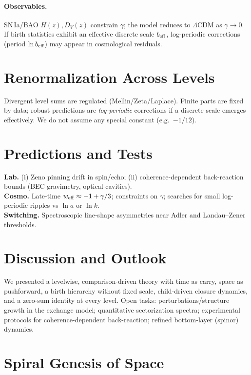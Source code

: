 \documentclass[11pt]{article}
\begin{document}
\paragraph{Observables.}
SN\,Ia/BAO $H(z),D_V(z)$ constrain $\gamma$; the model reduces to $\Lambda$CDM as $\gamma\to 0$.
If birth statistics exhibit an effective discrete scale $b_{\rm eff}$, log-periodic corrections (period $\ln b_{\rm eff}$) may appear in cosmological residuals.

\section{Renormalization Across Levels}
Divergent level sums are regulated (Mellin/Zeta/Laplace). Finite parts are fixed by data; robust predictions are \emph{log-periodic} corrections if a discrete scale emerges effectively. We do not assume any special constant (e.g.\ $-1/12$).

\section{Predictions and Tests}
\textbf{Lab.} (i) Zeno pinning drift in spin/echo; (ii) coherence-dependent back-reaction bounds (BEC gravimetry, optical cavities).\\
\textbf{Cosmo.} Late-time $w_{\rm eff}\approx -1+\gamma/3$; constraints on $\gamma$; searches for small log-periodic ripples vs $\ln a$ or $\ln k$.\\
\textbf{Switching.} Spectroscopic line-shape asymmetries near Adler and Landau--Zener thresholds.

\section{Discussion and Outlook}
We presented a levelwise, comparison-driven theory with time as carry, space as pushforward, a birth hierarchy without fixed scale, child-driven closure dynamics, and a zero-sum identity at every level. 
Open tasks: perturbations/structure growth in the exchange model; quantitative sectorization spectra; experimental protocols for coherence-dependent back-reaction; refined bottom-layer (spinor) dynamics.



\section{Spiral Genesis of Space}\label{sec:spiral-genesis}
\end{document}
